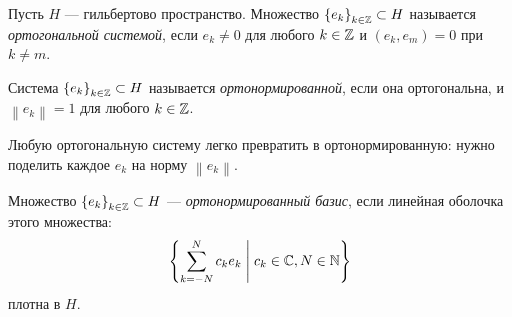 \documentclass[../complex-analysis.tex]{subfiles}
\begin{document}
\begin{df}
 Пусть $ H $ --- гильбертово пространство. Множество $ \left\{e_k\right\}_{k \in \mathbb{Z}} \subset H  $ называется \textit{ортогональной системой}, если $ e_k \neq 0 $ для любого $ k \in \mathbb{Z} $ и $ (e_k, e_m) = 0 $ при $ k \neq m $.
\end{df}
\begin{df}
 Система $ \left\{e_k\right\}_{k \in \mathbb{Z}} \subset H  $ называется \textit{ортонормированной}, если она ортогональна, и $\left\| e_k \right\|=1$ для любого $ k \in \mathbb{Z} $.
\end{df}
Любую ортогональную систему легко превратить в ортонормированную: нужно поделить каждое $ e_k $ на норму $ \left\| e_k \right\| $.
\begin{df}
 Множество $ \left\{e_k\right\}_{k\in\mathbb{Z}}  \subset H $ --- \textit{ортонормированный базис}, если линейная оболочка этого множества:
 \begin{align*}
     \left\{ \sum_{k=-N}^{N} c_k e_k \;\middle|\; c_k \in \mathbb{C}, N \in \mathbb{N} \right\}
 \end{align*} плотна в $ H $.
\end{df}
\end{document}
